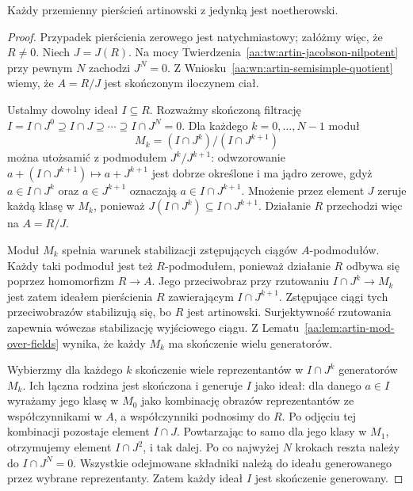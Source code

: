 \begin{twierdzenie}
\label{aa:tw:artin-implies-noether}
Każdy przemienny pierścień artinowski z jedynką
jest noetherowski.
\end{twierdzenie}
\begin{proof}
Przypadek pierścienia zerowego jest natychmiastowy;
załóżmy więc, że $R\ne0$. Niech $J=J(R)$.
Na mocy Twierdzenia~\ref{aa:tw:artin-jacobson-nilpotent}
przy pewnym $N$ zachodzi $J^N=0$.
Z Wniosku~\ref{aa:wn:artin-semisimple-quotient}
wiemy, że $A=R/J$ jest skończonym iloczynem ciał.

Ustalmy dowolny ideał $I\subseteq R$.
Rozważmy skończoną filtrację
$ I=I\cap J^0\supseteq I\cap J\supseteq\cdots
\supseteq I\cap J^N=0$.
Dla każdego $k=0,\ldots,N-1$ moduł
\[
 M_k=(I\cap J^k)/(I\cap J^{k+1})
\]
można utożsamić z podmodułem $J^k/J^{k+1}$:
odwzorowanie $a+(I\cap J^{k+1})\mapsto a+J^{k+1}$
jest dobrze określone i ma jądro zerowe, gdyż
$a\in I\cap J^k$ oraz $a\in J^{k+1}$ oznaczają
$a\in I\cap J^{k+1}$.
Mnożenie przez element $J$ zeruje każdą klasę w $M_k$,
ponieważ $J(I\cap J^k)\subseteq I\cap J^{k+1}$.
Działanie $R$ przechodzi więc na $A=R/J$.

Moduł $M_k$ spełnia warunek stabilizacji zstępujących
ciągów $A$-podmodułów. Każdy taki podmoduł jest też
$R$-podmodułem, ponieważ działanie $R$ odbywa się
poprzez homomorfizm $R\to A$. Jego przeciwobraz przy
rzutowaniu $I\cap J^k\to M_k$ jest zatem ideałem
pierścienia $R$ zawierającym $I\cap J^{k+1}$.
Zstępujące ciągi tych przeciwobrazów stabilizują się,
bo $R$ jest artinowski. Surjektywność rzutowania
zapewnia wówczas stabilizację wyjściowego ciągu.
Z Lematu~\ref{aa:lem:artin-mod-over-fields} wynika,
że każdy $M_k$ ma skończenie wielu generatorów.

Wybierzmy dla każdego $k$ skończenie wiele reprezentantów
w $I\cap J^k$ generatorów $M_k$. Ich łączna rodzina
jest skończona i generuje $I$ jako ideał: dla danego
$a\in I$ wyrażamy jego klasę w $M_0$ jako kombinację
obrazów reprezentantów ze współczynnikami w $A$,
a współczynniki podnosimy do $R$. Po odjęciu tej
kombinacji pozostaje element $I\cap J$.
Powtarzając to samo dla jego klasy w $M_1$, otrzymujemy
element $I\cap J^2$, i tak dalej.
Po co najwyżej $N$ krokach reszta należy do
$I\cap J^N=0$. Wszystkie odejmowane składniki należą
do ideału generowanego przez wybrane reprezentanty.
Zatem każdy ideał $I$ jest skończenie generowany.
\end{proof}

